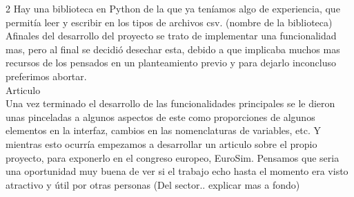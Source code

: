 2	Hay una biblioteca en Python de la que ya teníamos algo  de experiencia, que permitía leer y escribir en los tipos de archivos csv. (nombre de la biblioteca)\\

Afinales del desarrollo del proyecto se trato de implementar una funcionalidad mas, pero al final  se decidió desechar esta, debido a que implicaba muchos mas recursos de los pensados en un planteamiento previo y para dejarlo inconcluso  preferimos abortar.\\

Articulo\\

Una vez terminado el desarrollo de las funcionalidades principales se le dieron unas pinceladas a algunos aspectos de este como proporciones de algunos  elementos en la interfaz, cambios en las nomenclaturas de variables, etc. Y mientras esto ocurría empezamos a desarrollar un articulo sobre el propio proyecto, para exponerlo en el congreso europeo, EuroSim. Pensamos que seria una oportunidad muy buena  de ver si el trabajo echo hasta el momento era visto atractivo y útil por otras personas (Del sector.. explicar mas a  fondo)

